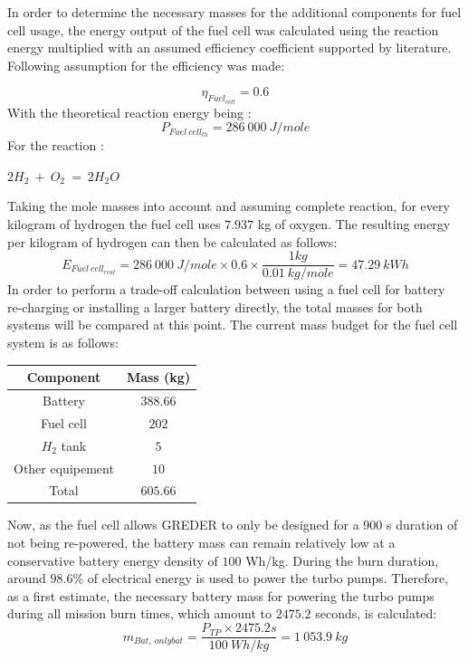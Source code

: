 In order to determine the necessary masses for the additional components for fuel cell usage, the energy output of the fuel cell was calculated using the reaction energy multiplied with an assumed efficiency coefficient supported by literature. Following assumption for the efficiency was made:

\begin{equation}
	\eta_{Fuel_{cell}} = 0.6
\end{equation}
With the theoretical reaction energy being :
\begin{equation}
	P_{Fuel\ cell_{th}} = 286\ 000 \ J/mole
\end{equation}
For the reaction :
\begin{center}
	$2H_2\ +\ O_2\ =\ 2H_2O$
\end{center}

Taking the mole masses into account and assuming complete reaction, for every kilogram of hydrogen the fuel cell uses $7.937$ kg of oxygen. The resulting energy per kilogram of hydrogen can then be calculated as follows:
\begin{equation}
	E_{Fuel\ cell_{real}} = 286\ 000\ J/mole \times 0.6\times\frac{1kg}{0.01\ kg/mole} = 47.29\ kWh
\end{equation}
In order to perform a trade-off calculation between using a fuel cell for battery re-charging or installing a larger battery directly, the total masses for both systems will be compared at this point. The current mass budget for the fuel cell system is as follows:
\begin{table}[H]
	\centering
	\begin{tabular}{|c|c|}
		\hline
		Component & Mass (kg)\\
		\hline
		Battery & $388.66$\\
		\hline
		Fuel cell & $202$\\
		\hline
		$H_2$ tank & $5$\\
		\hline
		Other equipement & $10$\\
		\hline
		\cellcolor{gray!50}Total & \cellcolor{gray!50}$605.66$
	\end{tabular}
\end{table}

Now, as the fuel cell allows GREDER to only be designed for a $900$ s duration of not being re-powered, the battery mass can remain relatively low at a conservative battery energy density of $100$  Wh/kg. During the burn duration, around $98.6$\% of electrical energy is used to power the turbo pumps. Therefore, as a first estimate, the necessary battery mass for powering the turbo pumps during all mission burn times, which amount to $2475.2$ seconds, is calculated:
\begin{equation}
	m_{Bat,\ only bat} = \frac{P_{TP}\times 2475.2s}{100\ Wh/kg} = 1\ 053.9\ kg
\end{equation}

